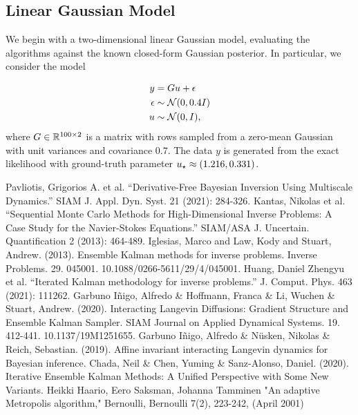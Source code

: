 \documentclass[12pt]{article}
\begin{document}
\subsection{Linear Gaussian Model}
We begin with a two-dimensional linear Gaussian model, evaluating the algorithms against the known closed-form Gaussian posterior. In particular, we consider the model 

\begin{align}
y &= G u + \epsilon \\
\epsilon &\sim \mathcal{N}(0, 0.4I) \nonumber \\
u &\sim \mathcal{N}(0, I), \nonumber
\end{align}
where $G \in \mathbb{R}^{100 \times 2}$ is a matrix with rows sampled from a zero-mean Gaussian with unit variances and covariance $0.7$. 
The data $y$ is generated from the exact likelihood with ground-truth parameter $u_\star \approx (1.216, 0.331)$.





\begin{thebibliography}{20}
 Pavliotis, Grigorios A. et al. “Derivative-Free Bayesian Inversion Using Multiscale Dynamics.” SIAM J. Appl. Dyn. Syst. 21 (2021): 284-326. 
 Kantas, Nikolas et al. “Sequential Monte Carlo Methods for High-Dimensional Inverse Problems: A Case Study for the Navier-Stokes Equations.” SIAM/ASA J. Uncertain. Quantification 2 (2013): 464-489. 
 Iglesias, Marco and Law, Kody and Stuart, Andrew. (2013). Ensemble Kalman methods for inverse problems. Inverse Problems. 29. 045001. 10.1088/0266-5611/29/4/045001. 
 Huang, Daniel Zhengyu et al. “Iterated Kalman methodology for inverse problems.” J. Comput. Phys. 463 (2021): 111262.
 Garbuno Iñigo, Alfredo \& Hoffmann, Franca \& Li, Wuchen \& Stuart, Andrew. (2020). Interacting Langevin Diffusions: Gradient Structure and Ensemble Kalman Sampler. SIAM Journal on Applied Dynamical Systems. 19. 412-441. 10.1137/19M1251655. 
 Garbuno Iñigo, Alfredo \& Nüsken, Nikolas \& Reich, Sebastian. (2019). Affine invariant interacting Langevin dynamics for Bayesian inference. 
 Chada, Neil \& Chen, Yuming \& Sanz-Alonso, Daniel. (2020). Iterative Ensemble Kalman Methods: A Unified Perspective with Some New Variants. 
 Heikki Haario, Eero Saksman, Johanna Tamminen "An adaptive Metropolis algorithm," Bernoulli, Bernoulli 7(2), 223-242, (April 2001)
\end{thebibliography}
\end{document}
